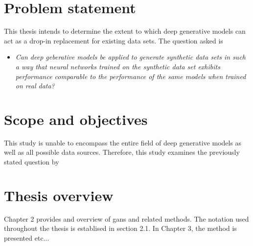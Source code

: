 \section{Problem statement}
This thesis intends to determine the extent to which deep generative models can act as a drop-in replacement for existing data sets. The question asked is

\begin{itemize}
    \item \textit{Can deep geberative models be applied to generate synthetic data sets in such a way that neural networks trained on the synthetic data set exhibits performance comparable to the performance of the same models when trained on real data?}
\end{itemize}


\section{Scope and objectives}
This study is unable to encompass the entire field of deep generative models as well as all possible data sources. Therefore, this study examines the previously stated question by

\section{Thesis overview}
Chapter 2 provides and overview of \acrlong{gans} and related methods. The notation used throughout the thesis is establised in section 2.1. In Chapter 3, the method is presented etc...



